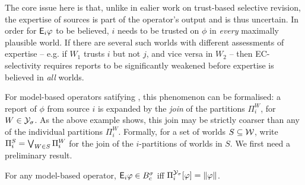 The core issue here is that, unlike in ealier work on trust-based selective
revision, the expertise of sources is part of the operator's output and is thus
uncertain. In order for $\mathsf{E}_i\varphi$ to be believed, $i$ needs to be trusted on
$\phi$ in \emph{every} maximally plausible world. If there are several such
worlds with different assessments of expertise -- e.g. if $W_1$ trusts $i$ but
not $j$, and vice versa in $W_2$ -- then EC-selectivity requires reports to be
significantly weakened before expertise is believed in \emph{all} worlds.

For model-based operators satifying \soundness{}, this phenomenon can be
formalised: a report of $\phi$ from source $i$ is expanded by the
\emph{join}\footnotemark{} of the partitions $\Pi^W_i$, for $W \in \mathcal{Y}_\sigma$.
As the above example shows, this join may be strictly coarser than any of the
individual partitions $\Pi^W_i$. Formally, for a set of worlds $S \subseteq
\mathcal{W}$, write $\Pi^S_i = \bigvee_{W \in S}{\Pi^W_i}$ for the join of the
$i$-partitions of worlds in $S$. We first need a preliminary result.


\begin{lemma}
    \label{kr_lemma_expertise_join}
    For any model-based operator, $\mathsf{E}_i\varphi \in B^\sigma_c$ iff
    $\Pi^{\mathcal{Y}_\sigma}_i[\varphi] = \|{\varphi}\|$.
\end{lemma}

